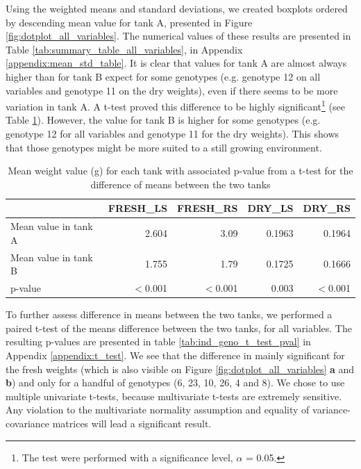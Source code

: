 \begin{table}[hbtp]
\begin{minipage}{0.45\textwidth}
 \end{minipage}
\label{tab:updated_germ_rates}
\end{table}

Using the weighted means and standard deviations, we created boxplots ordered by descending mean value for tank A, presented in Figure \ref{fig:dotplot_all_variables}. The numerical values of these results are presented in Table \ref{tab:summary_table_all_variables}, in Appendix \ref{appendix:mean_std_table}.
It is clear that values for tank A are almost always higher than for tank B expect for some genotypes (e.g. genotype 12 on all variables and genotype 11 on the dry weights), even if there seems to be more variation in tank A. A t-test proved this difference to be highly significant\footnote{The test were performed with a significance level, $\alpha$ = 0.05.} (see Table \ref{tab:mean_diff_between_tanks_t_test}). However, the value for tank B is higher for some genotypes (e.g. genotype 12 for all variables and genotype 11 for the dry weights). This shows that those genotypes might be more suited to a still growing environment.\\

\begin{table}[hbtp]
\centering
\caption[Mean difference between the 2 tanks]{Mean weight value (g) for each tank with associated p-value from a t-test for the difference of means between the two tanks}
\begin{tabular}{lrrrr}
  \toprule
 & FRESH\_LS & FRESH\_RS & DRY\_LS & DRY\_RS \\ 
  \midrule
Mean value in tank A  & 2.604 & 3.09 & 0.1963 & 0.1964 \\ 
Mean value in tank B & 1.755 & 1.79 & 0.1725 & 0.1666 \\ 
  p-value & $<$0.001 & $<$0.001 & 0.003 & $<$0.001 \\ 
   \bottomrule
\end{tabular}
\label{tab:mean_diff_between_tanks_t_test}
\end{table}

To further assess difference in means between the two tanks, we performed a paired t-test of the means difference between the two tanks, for all variables. The resulting p-values are presented in table \ref{tab:ind_geno_t_test_pval} in Appendix \ref{appendix:t_test}. We see that the difference in mainly significant for the fresh weights (which is also visible on Figure \ref{fig:dotplot_all_variables} \textbf{a} and \textbf{b}) and only for a handful of genotypes (6, 23, 10, 26, 4 and 8). We chose to use multiple univariate t-tests, because multivariate t-tests are extremely sensitive. Any violation to the multivariate normality assumption and equality of variance-covariance matrices will lead a significant result.

